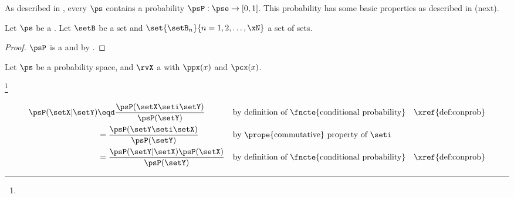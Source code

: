 As described in ,
every  $\ps$ contains a probability  $\psP:\pse\to[0,1]$.
This probability  has some basic properties as described in
 (next).
\begin{theorem}
\label{thm:P}
Let $\ps$ be a .
Let $\setB$ be a set and $\set{\setB_n}{n=1,2,\ldots,\xN}$ a set of sets.
\end{theorem}
\begin{proof}
$\psP$ is a  and by .
\end{proof}

\begin{proposition}
\label{prop:cdf_monotone}
Let $\ps$ be a probability space, and $\rvX$ a  
with  $\ppx(x)$ and
 $\pcx(x)$.
\end{proposition}

\begin{theorem}
\footnote{
  }
\thmbox{
  \psP(\setX|\setY) = \frac{\psP(\setY|\setX)\psP(\setX)}{\psP(\setY)}
  }
\end{theorem}
\begin{align*}
  \psP(\setX|\setY) 
    &\eqd \frac{\psP(\setX\seti\setY)}{\psP(\setY)}
    && \text{by definition of \fncte{conditional probability}}
    && \text{\xref{def:conprob}}
  \\&= \frac{\psP(\setY\seti\setX)}{\psP(\setY)}
    && \text{by \prope{commutative} property of $\seti$}
  \\&= \frac{\psP(\setY|\setX)\psP(\setX)}{\psP(\setY)}
    && \text{by definition of \fncte{conditional probability}}
    && \text{\xref{def:conprob}}
\end{align*}


